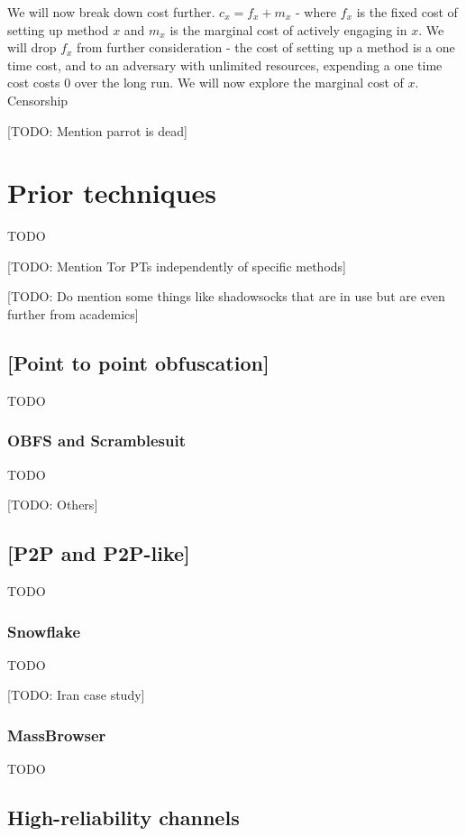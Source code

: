 \documentclass[12pt]{report}
\begin{document}
We will now break down cost further. $c_x = f_x + m_x$ - where $f_x$ is the fixed cost of setting up method $x$ and $m_x$ is the marginal cost of actively engaging in $x$. We will drop $f_x$ from further consideration - the cost of setting up a method is a one time cost, and to an adversary with unlimited resources, expending a one time cost costs $0$ over the long run. We will now explore the marginal cost of $x$. Censorship 


[TODO: Mention parrot is dead]

\section{Prior techniques}

TODO

[TODO: Mention Tor PTs independently of specific methods]

[TODO: Do mention some things like shadowsocks that are in use but are even further from academics]

\subsection{[Point to point obfuscation]}

TODO

\subsubsection{OBFS and Scramblesuit}

TODO

[TODO: Others]

\subsection{[P2P and P2P-like]}

TODO

\subsubsection{Snowflake}

TODO

[TODO: Iran case study]

\subsubsection{MassBrowser}

TODO

\subsection{High-reliability channels}
\end{document}
